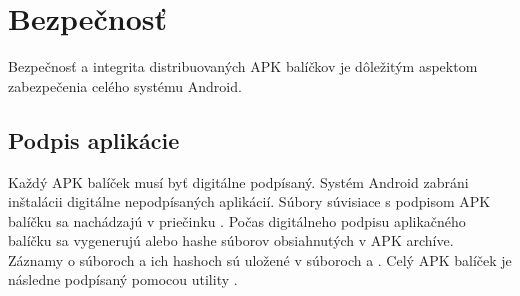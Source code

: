 \section{Bezpečnosť}

Bezpečnosť a integrita distribuovaných APK balíčkov je dôležitým aspektom zabezpečenia celého systému Android.

\subsection{Podpis aplikácie}

Každý APK balíček musí byť digitálne podpísaný. Systém Android zabráni inštalácii digitálne nepodpísaných aplikácií. 
Súbory súvisiace s podpisom APK balíčku sa nachádzajú v priečinku . Počas digitálneho podpisu aplikačného balíčku sa vygenerujú  alebo  hashe súborov obsiahnutých v APK archíve. Záznamy o súboroch a ich hashoch sú uložené v súboroch  a . Celý APK balíček je následne podpísaný pomocou utility . 

